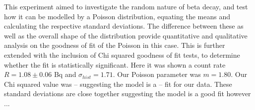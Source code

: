 \documentclass[11pt]{article}
\begin{document}
    This experiment aimed to investigate the random nature of beta decay, and test how it can be modelled by a Poisson distribution, equating the means and calculating the respective standard deviations. The difference between these as well as the overall shape of the distribution provide quantitative and qualitative analysis on the goodness of fit of the Poisson in this case. This is further extended with the inclusion of Chi squared goodness of fit tests, to determine whether the fit is statistically significant. 
    Here it was shown a count rate $ R = 1.08 \pm 0.06$ Bq and $\sigma_{hist} = 1.71$. Our Poisson parameter was $m = 1.80$. Our Chi squared value was -- suggesting the model is a -- fit for our data. These standard deviations are close together suggesting the model is a good fit however ...
    

    
\end{document}
